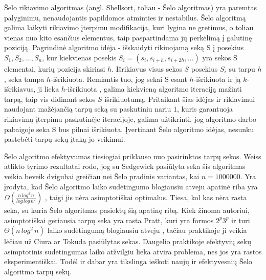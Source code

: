 \documentclass{VUMIFInfKursinis}
\begin{document}
Šelo rikiavimo algoritmas (angl. Shellsort, toliau - Šelo algoritmas) \cite{10.1145/368370.368387} yra paremtas palyginimu, nenaudojantis papildomos atminties ir nestabilus.
Šelo algoritmą galima laikyti rikiavimo įterpimu modifikacija,
kuri lygina ne gretimus, o toliau vienas nuo kito esančius elementus, taip paspartindama jų perkėlimą į galutinę poziciją.
Pagrindinė algoritmo idėja - išskaidyti rikiuojamą seką S į posekius $S_1, S_2, ..., S_n$,
kur kiekvienas posekis $S_i = (s_i, s_{i+h}, s_{i+2h}, ...)$ yra sekos S elementai, kurių pozicija skiriasi $h$.
Išrikiavus visus sekos $S$ posekius $S_i$ su tarpu $h$, seka tampa $h$-išrikiuota.
Remiantis tuo, jog sekai S esant $h$-išrikiuota ir ją $k$-išrikiavus, ji lieka $h$-išrikiuota \cite{GALE1972103},
galima kiekvieną algoritmo iteraciją mažinti tarpą, taip vis didinant sekos $S$ išrikiuotumą.
Pritaikant šias idėjas ir rikiavimui naudojant mažėjančią tarpų seką su paskutiniu nariu $1$,
kuris garantuoja rikiavimą įterpimu paskutinėje iteracijoje,
galima užtikrinti, jog algoritmo darbo pabaigoje seka S bus pilnai išrikiuota.
Įvertinant Šelo algoritmo idėjas, nesunku pastebėti tarpų sekų įtaką jo veikimui.

Šelo algoritmo efektyvumas tiesiogiai priklauso nuo pasirinktos tarpų sekos.
Weiss atlikto tyrimo \cite{weiss1991short} rezultatai rodo, jog su Sedgewick pasiūlyta seka
šis algoritmas veikia beveik dvigubai greičiau nei Šelo pradinis variantas, kai $n = 1000000$.
Yra įrodyta, kad Šelo algoritmo laiko sudėtingumo blogiausiu atveju apatinė riba yra
$\Omega(\frac{n\,log^2\,n}{log\,log\,n^2})$ \cite{267769}, taigi jis nėra asimptotiškai optimalus.
Tiesa, kol kas nėra rasta seka, su kuria Šelo algoritmas pasiektų šią apatinę ribą.
Kiek žinoma autoriui, asimptotiškai geriausia tarpų seka yra rasta Pratt, kuri yra formos
$2^p3^p$ ir turi $\Theta(n\,log^2\,n)$ laiko sudėtingumą blogiausiu atveju \cite{pratt1972shellsort},
tačiau praktikoje ji veikia lėčiau už Ciura \cite{ciura2001best} ar Tokuda \cite{10.5555/645569.659879} pasiūlytas sekas.
Daugelio praktikoje efektyvių sekų asimptotinis sudėtingumas laiko atžvilgiu lieka atvira problema,
nes jos yra rastos eksperimentiškai.
Todėl ir dabar yra tikslinga ieškoti naujų ir efektyvesnių Šelo algoritmo tarpų sekų.
\end{document}
